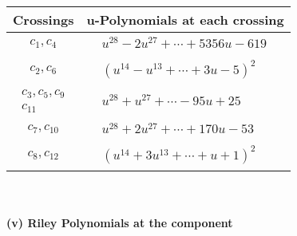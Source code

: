\documentclass[1p]{elsarticle_modified}
\theoremstyle{definition}
\begin{document}
\begin{tabular}{m{50pt}|m{274pt}}
Crossings & \hspace{64pt}u-Polynomials at each crossing \\
\hline $$\begin{aligned}c_{1},c_{4}\end{aligned}$$&$\begin{aligned}
&u^{28}-2 u^{27}+\cdots+5356 u-619
\end{aligned}$\\
\hline $$\begin{aligned}c_{2},c_{6}\end{aligned}$$&$\begin{aligned}
&(u^{14}- u^{13}+\cdots+3 u-5)^{2}
\end{aligned}$\\
\hline $$\begin{aligned}c_{3},c_{5},c_{9}\\c_{11}\end{aligned}$$&$\begin{aligned}
&u^{28}+u^{27}+\cdots-95 u+25
\end{aligned}$\\
\hline $$\begin{aligned}c_{7},c_{10}\end{aligned}$$&$\begin{aligned}
&u^{28}+2 u^{27}+\cdots+170 u-53
\end{aligned}$\\
\hline $$\begin{aligned}c_{8},c_{12}\end{aligned}$$&$\begin{aligned}
&(u^{14}+3 u^{13}+\cdots+u+1)^{2}
\end{aligned}$\\
\hline
\end{tabular}\\~\\
\newpage\renewcommand{\arraystretch}{1}
\flushleft \textbf{(v) Riley Polynomials at the component}\newline \\
\end{document}
